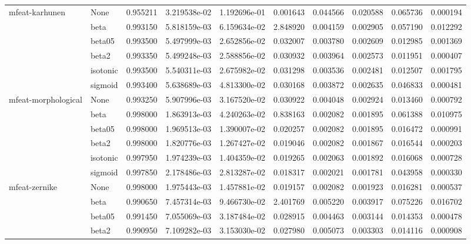 \begin{tabular}{llrrrrrrrr}
mfeat-karhunen & None &  0.955211 &  3.219538e-02 &  1.192696e-01 &   0.001643 &  0.044566 &  0.020588 &  0.065736 &  0.000194 \\
        & beta &  0.993150 &  5.818159e-03 &  6.159634e-02 &   2.848920 &  0.004159 &  0.002905 &  0.057190 &  0.012292 \\
        & beta05 &  0.993500 &  5.497999e-03 &  2.652856e-02 &   0.032007 &  0.003780 &  0.002609 &  0.012985 &  0.001369 \\
        & beta2 &  0.993350 &  5.499248e-03 &  2.588856e-02 &   0.030932 &  0.003964 &  0.002573 &  0.011951 &  0.000407 \\
        & isotonic &  0.993500 &  5.540311e-03 &  2.675982e-02 &   0.031298 &  0.003536 &  0.002481 &  0.012507 &  0.001795 \\
        & sigmoid &  0.993400 &  5.638689e-03 &  4.813300e-02 &   0.030168 &  0.003872 &  0.002635 &  0.046833 &  0.000481 \\
mfeat-morphological & None &  0.993250 &  5.907996e-03 &  3.167520e-02 &   0.030922 &  0.004048 &  0.002924 &  0.013460 &  0.000792 \\
        & beta &  0.998000 &  1.863913e-03 &  4.240263e-02 &   0.838163 &  0.002082 &  0.001895 &  0.061388 &  0.010975 \\
        & beta05 &  0.998000 &  1.969513e-03 &  1.390007e-02 &   0.020257 &  0.002082 &  0.001895 &  0.016472 &  0.000991 \\
        & beta2 &  0.998000 &  1.820776e-03 &  1.267427e-02 &   0.019046 &  0.002082 &  0.001867 &  0.016544 &  0.000203 \\
        & isotonic &  0.997950 &  1.974239e-03 &  1.404359e-02 &   0.019265 &  0.002063 &  0.001892 &  0.016068 &  0.000728 \\
        & sigmoid &  0.997850 &  2.178486e-03 &  2.813287e-02 &   0.018317 &  0.002021 &  0.001781 &  0.043958 &  0.000330 \\
mfeat-zernike & None &  0.998000 &  1.975443e-03 &  1.457881e-02 &   0.019157 &  0.002082 &  0.001923 &  0.016281 &  0.000537 \\
        & beta &  0.990650 &  7.457314e-03 &  9.466730e-02 &   2.401769 &  0.005220 &  0.003917 &  0.075226 &  0.016702 \\
        & beta05 &  0.991450 &  7.055069e-03 &  3.187484e-02 &   0.028915 &  0.004463 &  0.003144 &  0.014353 &  0.000478 \\
        & beta2 &  0.990950 &  7.109282e-03 &  3.153030e-02 &   0.027980 &  0.005073 &  0.003303 &  0.014116 &  0.000908 \\

\end{tabular}
